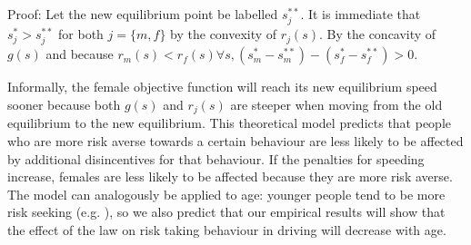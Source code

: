 Proof: Let the new equilibrium point be labelled $s_j^{**}$. It is immediate that $s_j^*>s_j^{**}$ for both $j=\{m,f\}$ by the convexity of $r_j (s)$. By the concavity of $g(s)$ and because $r_m (s)<r_f (s)  \forall s, (s_m^*-s_m^{**} ) - (s_f^*-s_f^{**})>0$. 

Informally, the female objective function will reach its new equilibrium speed sooner because both $g(s)$ and $r_j (s)$ are steeper when moving from the old equilibrium to the new equilibrium.
This theoretical model predicts that people who are more risk averse towards a certain behaviour are less likely to be affected by additional disincentives for that behaviour. If the penalties for speeding increase, females are less likely to be affected because they are more risk averse. The model can analogously be applied to age: younger people tend to be more risk seeking 
(e.g. \citet{gongyang2012}), 
so we also predict that our empirical results will show that the effect of the law on risk taking behaviour in driving will decrease with age.
